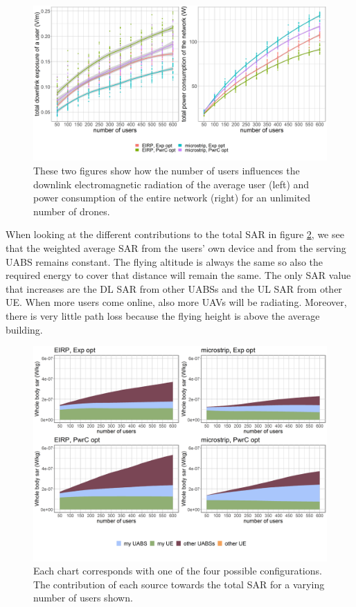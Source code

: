 \documentclass[twocolumn]{phdsymp} %
\begin{document}
\begin{figure}[h!]
  \includegraphics[width=\linewidth]{../results/s3/uvsdlAndPc.png}
  \caption{These two figures show how the number of users influences the downlink electromagnetic radiation of the average user (left) and 
  power consumption of the entire network (right) for an unlimited number of drones.}
  \label{fig:s3b_dlAndPC}
\end{figure}

When looking at the different contributions to the total \gls{SAR} in figure \ref{fig:s3b_fourSourcesMatrix}, 
we see that the weighted average 
\gls{SAR} from the users' own device and from the serving \gls{UABS} remains constant. The flying altitude is always the same so 
also the required energy to cover that distance will remain the same. 
The only \gls{SAR} value that increases are the \gls{DL} \gls{SAR} from other \gls{UABS}s and the \gls{UL} \gls{SAR} from other \gls{UE}. 
When more users come online, also more \gls{UAV}s will be radiating. Moreover, there is very little path loss because the flying height is above the
average building.

\begin{figure}[h!]
  \includegraphics[width=\linewidth]{../results/s3/uFourSources.png}
  \caption{Each chart corresponds with one of the four possible configurations. The contribution of each source towards the total 
  \gls{SAR} for a varying number of users shown.}
  \label{fig:s3b_fourSourcesMatrix}
\end{figure}
\end{document}
